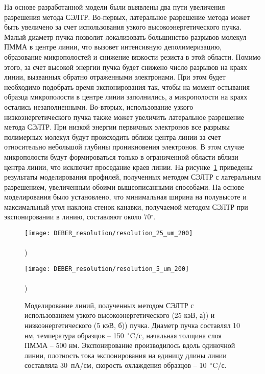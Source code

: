 На основе разработанной модели были выявлены два пути увеличения разрешения метода СЭЛТР.
Во-первых, латеральное разрешение метода может быть увеличено за счет использования узкого высокоэнергетического пучка.
Малый диаметр пучка позволит локализовать большинство разрывов молекул ПММА в центре линии, что вызовет интенсивную деполимеризацию, образование микрополостей и снижение вязкости резиста в этой области.
Помимо этого, за счет высокой энергии пучка будет снижено число разрывов на краях линии, вызванных обратно отраженными электронами.
При этом будет необходимо подобрать время экспонирования так, чтобы на момент остывания образца микрополости в центре линии заполнились, а микрополости на краях остались незаполненными.
Во-вторых, использование узкого низкоэнергетического пучка также может увеличить латеральное разрешение метода СЭЛТР.
При низкой энергии первичных электронов все разрывы полимерных молекул будут происходить вблизи центра линии за счет относительно небольшой глубины проникновения электронов.
В этом случае микрополости будут формироваться только в ограниченной области вблизи центра линии, что исключит проседание краев линии.
На рисунке~\ref{fig:DEBER_resolution} приведены результаты моделирования профилей, полученных методом СЭЛТР с латеральным разрешением, увеличенным обоими вышеописанными способами.
На основе моделирования было установлено, что минимальная ширина на полувысоте и максимальный угол наклона стенок канавки, получаемой методом СЭЛТР при экспонировании в линию, составляют около 70$^\circ$.

\begin{figure}[h]
	\begin{minipage}{0.48\textwidth}
		\texttt{[image: DEBER\_resolution/resolution\_25\_um\_200]} \\
		\vspace{-28.7ex} \\ ) \\ \vspace{28.7ex}
	\end{minipage}
	\begin{minipage}{0.48\textwidth}
		\texttt{[image: DEBER\_resolution/resolution\_5\_um\_200]} \\
		\vspace{-28.7ex} \\ ) \\ \vspace{28.7ex}
	\end{minipage}
	\vspace{-3.5em}
	\caption{Моделирование линий, полученных методом СЭЛТР с использованием узкого высокоэнергетического (25 кэВ, а)) и низкоэнергетического (5 кэВ, б)) пучка. Диаметр пучка составлял 10 нм, температура образцов -- 150~$^\circ$C/с, начальная толщина слоя ПММА -- 500 нм. Экспонирование производилось вдоль одиночной линии, плотность тока экспонирования на единицу длины линии составляла 30~пА/см, скорость охлаждения образцов -- 10~$^\circ$C/с.}
	\label{fig:DEBER_resolution}
\end{figure}


